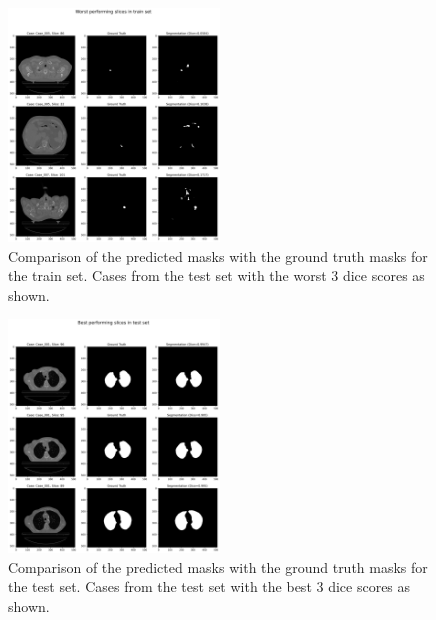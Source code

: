 \documentclass[11pt]{article}
\begin{document}
\begin{figure}[H]
    \centering
    \includegraphics[width=0.5\textwidth]{figs/Worst performing slices in train set.png}
    \caption{Comparison of the predicted masks with the ground truth masks for the train set. Cases from the test set with the worst 3 dice scores as shown.}
    \label{fig:worst_train_mask_comparison}
\end{figure}

\begin{figure}[H]
    \centering
    \includegraphics[width=0.5\textwidth]{figs/Best performing slices in test set.png}
    \caption{Comparison of the predicted masks with the ground truth masks for the test set. Cases from the test set with the best 3 dice scores as shown.}
    \label{fig:best_test_mask_comparison}
\end{figure}
\end{document}
